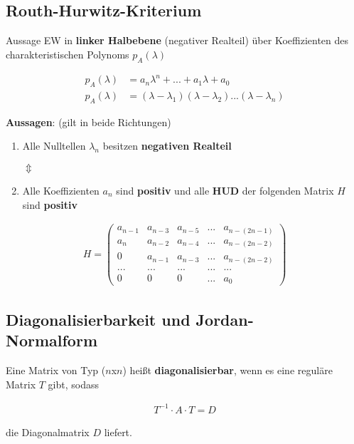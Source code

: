 \documentclass[10pt,a4paper]{article}
\begin{document}
  \subsection{Routh-Hurwitz-Kriterium}
  Aussage EW in \textbf{linker Halbebene} (negativer Realteil)
  über Koeffizienten des charakteristischen Polynoms $p_A(\lambda)$

  \begin{mdframed}[style=exercise]
    \begin{align}
        p_A(\lambda) &= a_n \lambda^n +...+ a_1 \lambda + a_0\\
        p_A(\lambda) &= (\lambda - \lambda_1)(\lambda - \lambda_2)...(\lambda - \lambda_n)
    \end{align}
  \end{mdframed}
\textbf{Aussagen}: (gilt in beide Richtungen)
\begin{enumerate}[{(1)}]
    \item Alle Nulltellen $\lambda_n$ besitzen \textbf{negativen Realteil}
    \begin{center} $\Updownarrow$\end{center}
    \item Alle Koeffizienten $a_n$ sind \textbf{positiv} und alle \textbf{HUD} der folgenden Matrix $H$ sind \textbf{positiv}
\end{enumerate}

  \begin{mdframed}[style=exercise]
    \begin{align} H =
        \begin{pmatrix}
            a_{n-1} & a_{n-3} & a_{n-5} & ...   & a_{n-(2n-1)} \\
             a_{n}  & a_{n-2} & a_{n-4} & ...   & a_{n-(2n-2)}\\
              0     & a_{n-1} & a_{n-3} & ...   & a_{n-(2n-2)}\\
             ...    &  ...    &  ...    & ...   &  ... \\
              0     &    0    &    0    & ...   &  a_{0}
        \end{pmatrix}
    \end{align}
  \end{mdframed}

  \subsection{Diagonalisierbarkeit und Jordan-\\Normalform}
  Eine Matrix von Typ ($n$x$n$) heißt \textbf{diagonalisierbar}, 
  wenn es eine reguläre Matrix $T$ gibt, sodass 
  \begin{mdframed}[style=exercise]
    \begin{align}
        T^{-1} \cdot A \cdot T = D 
    \end{align}
  \end{mdframed}
  die Diagonalmatrix $D$ liefert.
\end{document}
